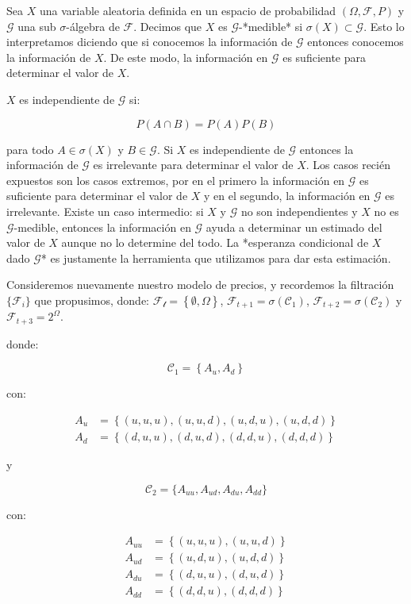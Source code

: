 \documentclass{extreport}
\theoremstyle{definicion}
\theoremstyle{propiedad}
\theoremstyle{teorema}
\begin{document}
Sea $X$ una variable aleatoria definida en un espacio de probabilidad $(\Omega, \mathcal{F}, P)$ y  $\mathcal{G}$  una sub $\sigma$-álgebra de $\mathcal{F}$.  Decimos que $X$ es $\mathcal{G}$-*medible* si $\sigma(X)\subset \mathcal{G}$. Esto lo interpretamos diciendo que si conocemos la información de $\mathcal{G}$ entonces conocemos la información de $X$. De este modo, la información en $\mathcal{G}$ es suficiente para determinar el valor de $X$. 

$X$ es independiente de $\mathcal{G}$ si:

$$
P(A\cap B) = P(A)P(B)
$$

para todo $A\in \sigma(X)$ y $B\in\mathcal{G}$. Si $X$ es independiente de $\mathcal{G}$ entonces la información de $\mathcal{G}$ es irrelevante para determinar el valor de $X.$ Los casos recién expuestos son los casos extremos, por en el primero la información en $\mathcal{G}$ es suficiente para determinar el valor de $X$ y en el segundo, la información en $\mathcal{G}$ es irrelevante. Existe un caso intermedio: si $X$ y $\mathcal{G}$ no son independientes y  $X$ no es $\mathcal{G}$-medible, entonces la información en $\mathcal{G}$ ayuda a determinar un estimado del valor de $X$ aunque no lo determine del todo. La *esperanza condicional de $X$  dado $\mathcal{G}$* es justamente la herramienta que utilizamos para dar esta estimación.

Consideremos nuevamente nuestro modelo de precios, y recordemos la filtración $\{\mathcal{F}_i\}$ que propusimos, donde: $\mathcal{F_t} = \left\{\emptyset, \Omega\right\}$, $\mathcal{F}_{t+1} = \sigma(\mathcal{C}_1)$, $\mathcal{F}_{t+2} = \sigma(\mathcal{C}_2)$ y $\mathcal{F}_{t+3} = 2^\Omega$.

donde:

 

$$
\mathcal{C}_1 = \left\{A_u, A_d\right\}
$$

con:


\begin{align*}
A_u & = \left\{(u,u,u),(u,u,d),(u,d,u),(u,d,d)\right\} \\
A_d & = \left\{(d,u,u),(d,u,d),(d,d,u),(d,d,d)\right\} 
\end{align*}


y 

$$
\mathcal{C}_2= \{A_{uu}, A_{ud}, A_{du}, A_{dd}\}
$$

con:


\begin{align*}
A_{uu} & = \left\{(u,u,u),(u,u,d)\right\} \\
A_{ud} & = \left\{(u,d,u),(u,d,d)\right\}\\ 
A_{du} & = \left\{(d,u,u),(d,u,d)\right\} \\
A_{dd} & = \left\{(d,d,u),(d,d,d)\right\}
\end{align*}
\end{document}
